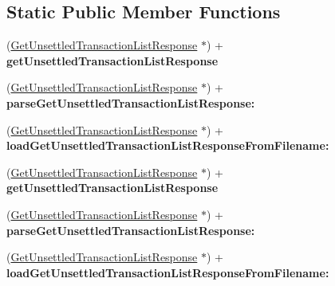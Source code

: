 \subsection*{Static Public Member Functions}
\begin{DoxyCompactItemize}
\item 
\hypertarget{interface_get_unsettled_transaction_list_response_acf62d89fb958421576f93242364f95f0}{
(\hyperlink{interface_get_unsettled_transaction_list_response}{GetUnsettledTransactionListResponse} $\ast$) + {\bfseries getUnsettledTransactionListResponse}}
\label{interface_get_unsettled_transaction_list_response_acf62d89fb958421576f93242364f95f0}

\item 
\hypertarget{interface_get_unsettled_transaction_list_response_a68f7d525743e540145f0f84bd0544019}{
(\hyperlink{interface_get_unsettled_transaction_list_response}{GetUnsettledTransactionListResponse} $\ast$) + {\bfseries parseGetUnsettledTransactionListResponse:}}
\label{interface_get_unsettled_transaction_list_response_a68f7d525743e540145f0f84bd0544019}

\item 
\hypertarget{interface_get_unsettled_transaction_list_response_a286cba77a71383111bc9d36ca71d42be}{
(\hyperlink{interface_get_unsettled_transaction_list_response}{GetUnsettledTransactionListResponse} $\ast$) + {\bfseries loadGetUnsettledTransactionListResponseFromFilename:}}
\label{interface_get_unsettled_transaction_list_response_a286cba77a71383111bc9d36ca71d42be}

\item 
\hypertarget{interface_get_unsettled_transaction_list_response_acf62d89fb958421576f93242364f95f0}{
(\hyperlink{interface_get_unsettled_transaction_list_response}{GetUnsettledTransactionListResponse} $\ast$) + {\bfseries getUnsettledTransactionListResponse}}
\label{interface_get_unsettled_transaction_list_response_acf62d89fb958421576f93242364f95f0}

\item 
\hypertarget{interface_get_unsettled_transaction_list_response_a68f7d525743e540145f0f84bd0544019}{
(\hyperlink{interface_get_unsettled_transaction_list_response}{GetUnsettledTransactionListResponse} $\ast$) + {\bfseries parseGetUnsettledTransactionListResponse:}}
\label{interface_get_unsettled_transaction_list_response_a68f7d525743e540145f0f84bd0544019}

\item 
\hypertarget{interface_get_unsettled_transaction_list_response_a286cba77a71383111bc9d36ca71d42be}{
(\hyperlink{interface_get_unsettled_transaction_list_response}{GetUnsettledTransactionListResponse} $\ast$) + {\bfseries loadGetUnsettledTransactionListResponseFromFilename:}}
\label{interface_get_unsettled_transaction_list_response_a286cba77a71383111bc9d36ca71d42be}


\end{DoxyCompactItemize}
